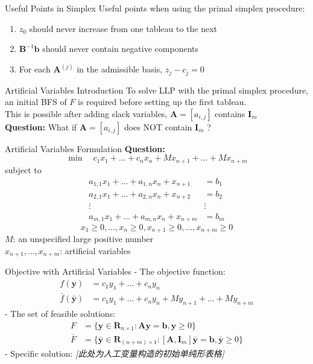 \documentclass[aspectratio=169,hyperref,UTF8,CJK]{beamer}
\begin{document}
\begin{frame}{Useful Points in Simplex}
Useful points when using the primal simplex procedure:
\begin{enumerate}
    \item \(z_0\) should never increase from one tableau to the next
    \item \(\mathbf{B}^{-1}\mathbf{b}\) should never contain negative components
    \item For each \(\mathbf{A}^{(j)}\) in the admissible basis, \(z_j - c_j = 0\)
\end{enumerate}
\end{frame}

\begin{frame}{Artificial Variables Introduction}
To solve LLP with the primal simplex procedure, an initial BFS of \(F\) is required before setting up the first tableau. \\
This is possible after adding slack variables, \(\mathbf{A} = [a_{i,j}]\) contains \(\mathbf{I}_{m}\) \\
\textbf{Question:} What if \(\mathbf{A} = [a_{i,j}]\) does NOT contain \(\mathbf{I}_{m}\) ?
\end{frame}

\begin{frame}{Artificial Variables Formulation}
\textbf{Question:}
\[
\min \quad c_1x_1 + \dots + c_nx_n + Mx_{n+1} + \dots + Mx_{n+m}
\]
subject to
\begin{align*}
a_{1,1}x_1 + \dots + a_{1,n}x_n + x_{n+1} &= b_1 \\
a_{2,1}x_1 + \dots + a_{2,n}x_n + x_{n+2} &= b_2 \\
\vdots & \vdots \\
a_{m,1}x_1 + \dots + a_{m,n}x_n + x_{n+m} &= b_m
\end{align*}
\[
x_1 \ge 0, \dots, x_n \ge 0, x_{n+1} \ge 0, \dots, x_{n+m} \ge 0
\]
\(M\): an unspecified large positive number \\
\(x_{n+1}, \dots, x_{n+m}\): artificial variables
\end{frame}

\begin{frame}{Objective with Artificial Variables}
- The objective function:
\begin{align*}
f(\mathbf{y}) &= c_1y_1 + \dots +c_ny_n \\
\bar{f}(\bar{\mathbf{y}}) &= c_1y_1 + \dots +c_ny_n + My_{n+1} + \dots +My_{n+m}
\end{align*}
- The set of feasible solutions:
\begin{align*}
F &= \{\mathbf{y}\in \mathbf{R}_{n\times 1}:\mathbf{A}\mathbf{y} = \mathbf{b},\mathbf{y}\geq 0\} \\
\bar{F} &= \{\bar{\mathbf{y}}\in \mathbf{R}_{(n + m)\times 1}:[\mathbf{A},\mathbf{I}_m]\bar{\mathbf{y}} = \mathbf{b},\bar{\mathbf{y}}\geq 0\}
\end{align*}
- Specific solution:
\textit{[此处为人工变量构造的初始单纯形表格]}
\end{frame}
\end{document}

